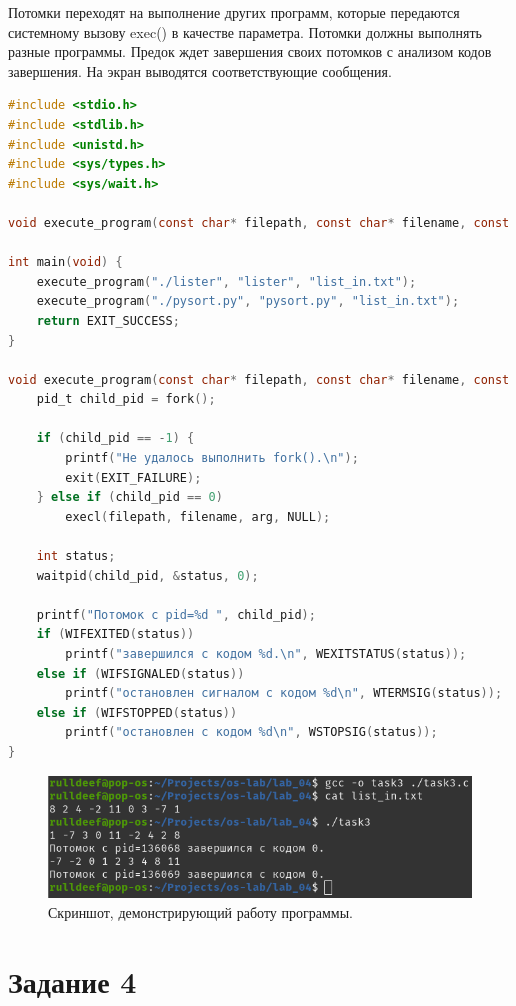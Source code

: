 Потомки переходят на выполнение других программ, которые передаются системному вызову exec() в качестве параметра. Потомки должны выполнять разные программы. Предок ждет завершения своих потомков с анализом кодов завершения. На экран выводятся соответствующие сообщения.

\begin{lstlisting}[language=C,caption=Исходный код для задания 3.]
#include <stdio.h>
#include <stdlib.h>
#include <unistd.h>
#include <sys/types.h>
#include <sys/wait.h>

void execute_program(const char* filepath, const char* filename, const char* arg);

int main(void) {
	execute_program("./lister", "lister", "list_in.txt");
	execute_program("./pysort.py", "pysort.py", "list_in.txt");
	return EXIT_SUCCESS;
}

void execute_program(const char* filepath, const char* filename, const char* arg) {
	pid_t child_pid = fork();
	
	if (child_pid == -1) {
		printf("Не удалось выполнить fork().\n");
		exit(EXIT_FAILURE);
	} else if (child_pid == 0)
		execl(filepath, filename, arg, NULL);
	
	int status;
	waitpid(child_pid, &status, 0);
	
	printf("Потомок с pid=%d ", child_pid);
	if (WIFEXITED(status))
		printf("завершился с кодом %d.\n", WEXITSTATUS(status));
	else if (WIFSIGNALED(status))
		printf("остановлен сигналом с кодом %d\n", WTERMSIG(status));
	else if (WIFSTOPPED(status))
		printf("остановлен с кодом %d\n", WSTOPSIG(status));
}
\end{lstlisting}

\begin{figure}[ht]
	\centering
	\includegraphics[width=\linewidth]{img/task3.png}
	\caption{Скриншот, демонстрирующий работу программы.}
\end{figure}

\clearpage

\section{Задание 4}

